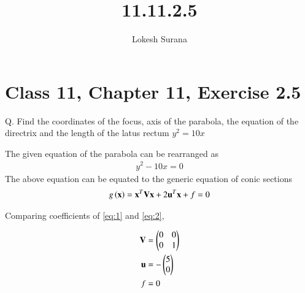 \documentclass[journal,12pt,twocolumn]{IEEEtran}
\renewcommand{\vec}[1]{\boldsymbol{\mathbf{#1}}}
\begin{document}
\vspace{3cm}
\title{11.11.2.5}
\author{Lokesh Surana}
\maketitle
\section*{Class 11, Chapter 11, Exercise 2.5}

Q. Find the coordinates of the focus, axis of the parabola, the equation of the directrix and the length of the latus rectum $y^2 = 10x$

\solution
The given equation of the parabola can be rearranged as
\begin{align}
    \label{eq:1} y^2-10x = 0
\end{align}
The above equation can be equated to the generic equation of conic sections
\begin{align}
    \label{eq:2} g\brak{\vec{x}} = \vec{x}^T\vec{V}\vec{x} + 2\vec{u}^T\vec{x} + f = 0 
\end{align}

Comparing coefficients of \eqref{eq:1} and \eqref{eq:2},

\begin{align}
    \label{eq:3}
	\vec{V} &= \myvec{ 0 & 0 \\ 0 & 1} \\
	\label{eq:4}
	\vec{u} &= -\myvec{5 \\ 0} \\
	\label{eq:5}
	f &= 0 
\end{align}
\end{document}
